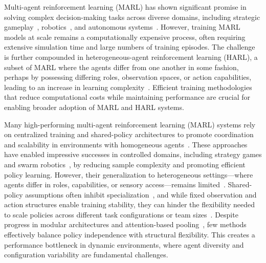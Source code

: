 \documentclass{article}
\begin{document}
Multi-agent reinforcement learning (MARL) has shown significant promise in solving complex 
decision-making tasks across diverse domains, including 
strategic gameplay~\cite{silver2016, vinyals2019, berner2019}, 
robotics~\cite{rizk2019, liang2024}, 
and autonomous systems~\cite{abeywickrama2022}. 
However, training MARL models at scale remains a computationally expensive process, 
often requiring extensive simulation time and large numbers of training episodes. 
The challenge is further compounded in heterogeneous-agent reinforcement learning (HARL), 
a subset of MARL where the agents 
differ from one another in some fashion, perhaps by possessing 
differing roles, observation spaces, 
or action capabilities, leading to an increase in learning complexity~\cite{rizk2019, yang2021a}.
Efficient training methodologies that reduce computational costs while maintaining 
performance are crucial for enabling broader adoption of MARL and HARL systems.

Many high-performing multi-agent reinforcement learning (MARL) systems rely on 
centralized training and shared-policy architectures to promote coordination and scalability 
in environments with homogeneous agents~\cite{ackermann2019,zhou2023}.
These approaches have enabled impressive successes in controlled domains, 
including strategy games and swarm robotics~\cite{vinyals2019, hoang2023}, 
by reducing sample complexity and promoting efficient policy learning. However, their 
generalization to heterogeneous settings—where agents differ in roles, capabilities, or 
sensory access—remains limited~\cite{zhong2024}. 
Shared-policy assumptions often inhibit specialization~\cite{smit2023}, 
and while fixed observation and action structures enable training stability, 
they can hinder the flexibility needed to scale policies across different 
task configurations or team sizes~\cite{papoudakis2021}. Despite progress 
in modular architectures and attention-based pooling~\cite{iqbal2021, foerster2017}, 
few methods effectively balance policy independence with structural flexibility. 
This creates a performance bottleneck in dynamic environments, where agent diversity and 
configuration variability are fundamental challenges.
\end{document}

